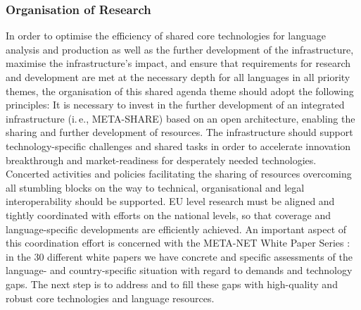 \documentclass[10pt, plain]{../../metanetpaper}
\begin{document}
\begin{multicols}{2}
\subsubsection{Organisation of Research}
\label{sec:org-research-pt4}

In order to optimise the efficiency of shared core technologies for language analysis and production as well as the further development of the infrastructure, maximise the infrastructure's impact, and ensure that requirements for research and development are met at the necessary depth for all languages in all priority themes, the organisation of this shared agenda theme should adopt the following principles: It is necessary to invest in the further development of an integrated infrastructure (i.\,e., META-SHARE) based on an open architecture, enabling the sharing and further development of resources. The infrastructure should support technology-specific challenges and shared tasks in order to accelerate innovation breakthrough and market-readiness for desperately needed technologies. Concerted activities and policies facilitating the sharing of resources overcoming all stumbling blocks on the way to technical, organisational and legal interoperability should be supported. EU level research must be aligned and tightly coordinated with efforts on the national levels, so that coverage and language-specific developments are efficiently achieved. An important aspect of this coordination effort is concerned with the META-NET White Paper Series \cite{LWP2012}: in the 30 different white papers we have concrete and specific assessments of the language- and country-specific situation with regard to demands and technology gaps. The next step is to address and to fill these gaps with high-quality and robust core technologies and language resources.



\end{multicols}
\end{document}
